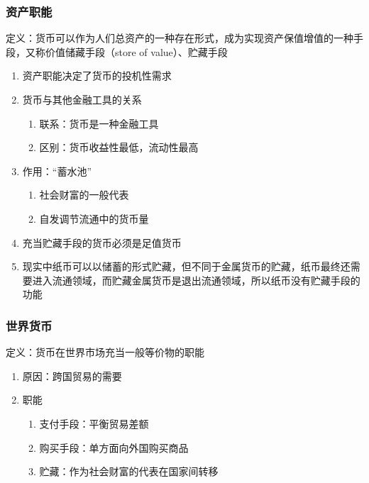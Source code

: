 \documentclass[12pt]{book}
\begin{document}
\subsubsection{资产职能}

定义：货币可以作为人们总资产的一种存在形式，成为实现资产保值增值的一种手段，又称价值储藏手段（store of value）、贮藏手段

\begin{enumerate}[1.]
    \item 资产职能决定了货币的投机性需求
    \item 货币与其他金融工具的关系
    \begin{enumerate}[(1)]
        \item 联系：货币是一种金融工具
        \item 区别：货币收益性最低，流动性最高
    \end{enumerate}
    \item 作用：“蓄水池”
    \begin{enumerate}[(1)]
        \item 社会财富的一般代表
        \item 自发调节流通中的货币量
    \end{enumerate}
    \item 充当贮藏手段的货币必须是足值货币
    \item 现实中纸币可以以储蓄的形式贮藏，但不同于金属货币的贮藏，纸币最终还需要进入流通领域，而贮藏金属货币是退出流通领域，所以纸币没有贮藏手段的功能 
\end{enumerate}


\subsubsection{世界货币}

定义：货币在世界市场充当一般等价物的职能

\begin{enumerate}[1.]
    \item 原因：跨国贸易的需要
    \item 职能
    \begin{enumerate}[(1)]
        \item 支付手段：平衡贸易差额
        \item 购买手段：单方面向外国购买商品
        \item 贮藏：作为社会财富的代表在国家间转移
    \end{enumerate}
\end{enumerate}
\end{document}
